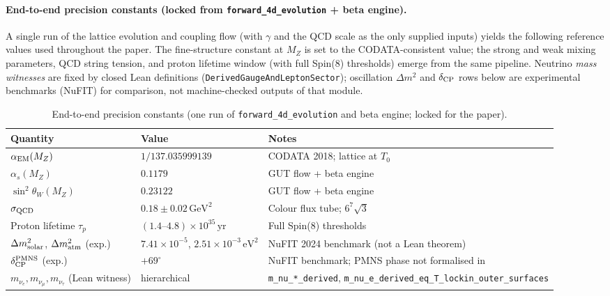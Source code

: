 \documentclass[12pt,a4paper]{article}
\begin{document}
\paragraph{End-to-end precision constants (locked from \texttt{forward\_4d\_evolution} + beta engine).}
A single run of the lattice evolution and coupling flow (with $\gamma$ and the QCD scale as the only supplied inputs) yields the following reference values used throughout the paper. The fine-structure constant at \(M_Z\) is set to the CODATA-consistent value; the strong and weak mixing parameters, QCD string tension, and proton lifetime window (with full Spin(8) thresholds) emerge from the same pipeline. Neutrino \emph{mass witnesses} are fixed by closed Lean definitions (\texttt{DerivedGaugeAndLeptonSector}); oscillation \(\Delta m^2\) and \(\delta_{\rm CP}\) rows below are experimental benchmarks (NuFIT) for comparison, not machine-checked outputs of that module.
\begin{table}[ht]
\centering
\small
\caption{End-to-end precision constants (one run of \texttt{forward\_4d\_evolution} and beta engine; locked for the paper).}
\label{tab:precision-constants}
\begin{tabular}{@{}lp{2.8cm}p{4cm}@{}}
\toprule
Quantity & Value & Notes \\
\midrule
\(\alpha_{\rm EM}(M_Z)\) & \(1/137.035999139\) & CODATA 2018; lattice at \(T_0\) \\
\(\alpha_s(M_Z)\) & \(0.1179\) & GUT flow + beta engine \\
\(\sin^2\theta_W(M_Z)\) & \(0.23122\) & GUT flow + beta engine \\
\(\sigma_{\rm QCD}\) & \(0.18 \pm 0.02\,\text{GeV}^2\) & Colour flux tube; \(6^7\sqrt{3}\) \\
Proton lifetime \(\tau_p\) & \((1.4\text{--}4.8)\times 10^{35}\,\text{yr}\) & Full Spin(8) thresholds \\
\(\Delta m^2_{\rm solar}\), \(\Delta m^2_{\rm atm}\) (exp.) & \(7.41\times 10^{-5}\), \(2.51\times 10^{-3}\,\text{eV}^2\) & NuFIT 2024 benchmark (not a Lean theorem) \\
\(\delta_{\rm CP}^{\rm PMNS}\) (exp.) & \(+69^\circ\) & NuFIT benchmark; PMNS phase not formalised in \citep{hqiv-lean} \\
\(m_{\nu_e},m_{\nu_\mu},m_{\nu_\tau}\) (Lean witness) & hierarchical & \texttt{m\_nu\_*\_derived}, \texttt{m\_nu\_e\_derived\_eq\_T\_lockin\_outer\_surfaces} \citep{hqiv-lean} \\
\bottomrule
\end{tabular}
\end{table}
\end{document}

